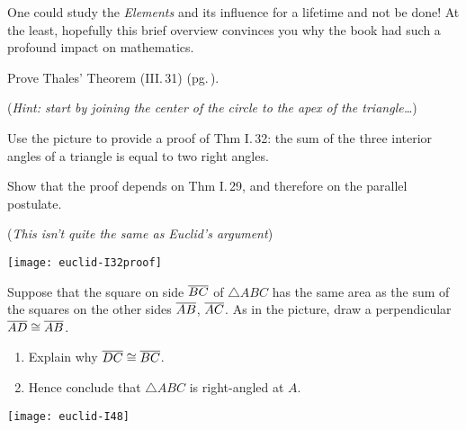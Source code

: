 One could study the \emph{Elements} and its influence for a lifetime and not be done! At the least, hopefully this brief overview convinces you why the book had such a profound impact on mathematics.

\begin{exercises}
\exstart Prove Thales' Theorem (III.\,31) (pg.\,\pageref{pg:thalesthm}).\vspace{-5pt}

\begin{enumerate}\setcounter{enumi}{1}
  \item[](\emph{Hint: start by joining the center of the circle to the apex of the triangle\ldots})
  
  \begin{minipage}[t]{0.7\linewidth}\vspace{0pt}
  \item%
  Use the picture to provide a proof of Thm I.\,32: the sum of the three interior angles of a triangle is equal to two right angles.\par
  Show that the proof depends on Thm I.\,29, and therefore on the parallel postulate.\par
  (\emph{This isn't quite the same as Euclid's argument})
  \end{minipage}\hfill\begin{minipage}[t]{0.29\linewidth}\vspace{0pt}
  \flushright\texttt{[image: euclid-I32proof]}
  \end{minipage}
  
  \begin{minipage}[t]{0.7\linewidth}\vspace{0pt}
  \item\label{exs:pythagconv} Suppose that the square on side $\overline{BC}$ of $\triangle ABC$ has the same area as the sum of the squares on the other sides $\overline{AB}$, $\overline{AC}$. As in the picture, draw a perpendicular $\overline{AD}\cong \overline{AB}$.
  \begin{enumerate}
    \item Explain why $\overline{DC}\cong\overline{BC}$.
    \item Hence conclude that $\triangle ABC$ is right-angled at $A$.
  \end{enumerate}
  \end{minipage}\hfill\begin{minipage}[t]{0.29\linewidth}\vspace{0pt}
  \flushright\texttt{[image: euclid-I48]}
  \end{minipage}



\end{enumerate}
\end{exercises}
